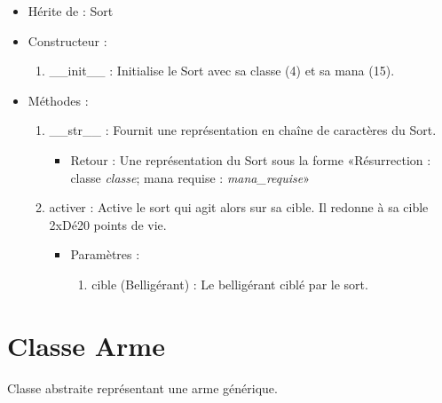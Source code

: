\documentclass[12pt,pdftex,oneside]{article}
\begin{document}
  \begin{itemize}
  \item Hérite de : Sort

  \item Constructeur : 

  \begin{enumerate}
  \item \_\_init\_\_ : Initialise le Sort avec sa classe (4) et sa mana (15).

  \end{enumerate}

  \item Méthodes : 

    \begin{enumerate}
    \item \_\_str\_\_ : Fournit une représentation en chaîne de caractères du Sort.
      \begin{itemize}
      \item Retour : Une représentation du Sort sous la forme «Résurrection : classe \emph{classe}; mana requise : \emph{mana\_requise}»
      \end{itemize}
    \item activer : Active le sort qui agit alors sur sa cible. Il redonne à sa
      cible 2xDé20 points de vie.
      \begin{itemize}
      \item Paramètres : 
        \begin{enumerate}
        \item cible (Belligérant) : Le belligérant ciblé par le sort.
        \end{enumerate}
      \end{itemize}

    \end{enumerate}
  \end{itemize}

  \section {Classe Arme}

  Classe abstraite représentant une arme générique.
\end{document}
